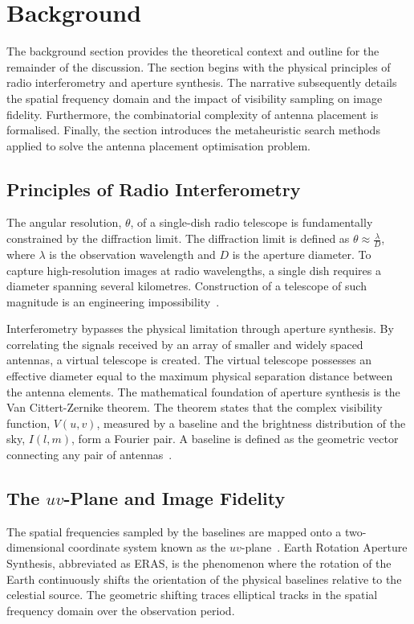 \documentclass[conference]{IEEEtran}
\begin{document}
\section{Background}

The background section provides the theoretical context and outline for the remainder of the discussion. 
The section begins with the physical principles of radio interferometry and aperture synthesis. 
The narrative subsequently details the spatial frequency domain and the impact of visibility sampling 
on image fidelity. Furthermore, the combinatorial complexity of antenna placement is formalised. 
Finally, the section introduces the metaheuristic search methods applied to solve the antenna 
placement optimisation problem.

\subsection{Principles of Radio Interferometry}
The angular resolution, $\theta$, of a single-dish radio telescope is fundamentally constrained 
by the diffraction limit. The diffraction limit is defined as $\theta \approx \frac{\lambda}{D}$, 
where $\lambda$ is the observation wavelength and $D$ is the aperture diameter. To capture high-resolution 
images at radio wavelengths, a single dish requires a diameter spanning several kilometres. Construction of 
a telescope of such magnitude is an engineering impossibility~\cite{thompson2017}.

Interferometry bypasses the physical limitation through aperture synthesis. By correlating the signals 
received by an array of smaller and widely spaced antennas, a virtual telescope is created. 
The virtual telescope possesses an effective diameter equal to the maximum physical separation 
distance between the antenna elements. The mathematical foundation of aperture synthesis is the Van 
Cittert-Zernike theorem. The theorem states that the complex visibility function, $V(u,v)$, measured 
by a baseline and the brightness distribution of the sky, $I(l,m)$, form a Fourier pair. A baseline is 
defined as the geometric vector connecting any pair of antennas~\cite{thompson2017}.

\subsection{The $uv$-Plane and Image Fidelity}
The spatial frequencies sampled by the baselines are mapped onto a two-dimensional coordinate system 
known as the $uv$-plane~\cite{thompson2017}. Earth Rotation Aperture Synthesis, abbreviated as ERAS, is the phenomenon 
where the rotation of the Earth continuously shifts the orientation of the physical baselines relative 
to the celestial source. The geometric shifting traces elliptical tracks in the spatial frequency 
domain over the observation period. 
\end{document}

